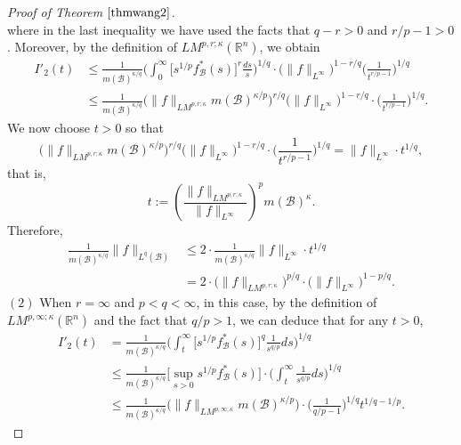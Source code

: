 \documentclass{birkjour}
\theoremstyle{definition}
\theoremstyle{remark}
\numberwithin{equation}{section}
\begin{document}
\begin{proof}[Proof of Theorem $\ref{thmwang2}$]
\begin{equation*}
\end{equation*}
where in the last inequality we have used the facts that $q-r>0$ and $r/p-1>0$. Moreover, by the definition of $LM^{p,r;\kappa}(\mathbb R^n)$, we obtain
\begin{equation*}
\begin{split}
I'_2(t)&\leq\frac{1}{m(\mathcal{B})^{\kappa/q}}
\bigg(\int_0^{\infty}\Big[s^{1/p}f^{*}_{\mathcal{B}}(s)\Big]^r\frac{ds}{s}\bigg)^{1/q}
\cdot\big(\|f\|_{L^\infty}\big)^{1-r/q}\Big(\frac{1}{t^{r/p-1}}\Big)^{1/q}\\
&\leq\frac{1}{m(\mathcal{B})^{\kappa/q}}
\big(\|f\|_{LM^{p,r;\kappa}}m(\mathcal{B})^{\kappa/p}\big)^{r/q}
\big(\|f\|_{L^\infty}\big)^{1-r/q}\cdot\Big(\frac{1}{t^{r/p-1}}\Big)^{1/q}.
\end{split}
\end{equation*}
We now choose $t>0$ so that
\begin{equation*}
\big(\|f\|_{LM^{p,r;\kappa}}m(\mathcal{B})^{\kappa/p}\big)^{r/q}
\big(\|f\|_{L^\infty}\big)^{1-r/q}\cdot\Big(\frac{1}{t^{r/p-1}}\Big)^{1/q}=\|f\|_{L^\infty}\cdot t^{1/q},
\end{equation*}
that is,
\begin{equation*}
t:=\left(\frac{\|f\|_{LM^{p,r;\kappa}}}{\|f\|_{L^\infty}}\right)^pm(\mathcal{B})^{\kappa}.
\end{equation*}
Therefore,
\begin{equation*}
\begin{split}
\frac{1}{m(\mathcal{B})^{\kappa/q}}\|f\|_{L^{q}(\mathcal{B})}
&\leq 2\cdot\frac{1}{m(\mathcal{B})^{\kappa/q}}\|f\|_{L^\infty}\cdot t^{1/q}\\
&=2\cdot\big(\|f\|_{LM^{p,r;\kappa}}\big)^{p/q}\cdot\big(\|f\|_{L^\infty}\big)^{1-p/q}.
\end{split}
\end{equation*}
$(2)$ When $r=\infty$ and $p<q<\infty$, in this case, by the definition of $LM^{p,\infty;\kappa}(\mathbb R^n)$ and the fact that $q/p>1$, we can deduce that for any $t>0$,
\begin{equation*}
\begin{split}
I'_2(t)&=\frac{1}{m(\mathcal{B})^{\kappa/q}}\bigg(\int_{t}^{\infty}\big[s^{1/p}f^{*}_{\mathcal{B}}(s)\big]^{q}\frac{1}{s^{q/p}}ds\bigg)^{1/q}\\
&\leq\frac{1}{m(\mathcal{B})^{\kappa/q}}\Big[\sup_{s>0}s^{1/p}f^{*}_{\mathcal{B}}(s)\Big]
\cdot\bigg(\int_{t}^{\infty}\frac{1}{s^{q/p}}ds\bigg)^{1/q}\\
&\leq \frac{1}{m(\mathcal{B})^{\kappa/q}}
\big(\|f\|_{LM^{p,\infty;\kappa}}m(\mathcal{B})^{\kappa/p}\big)\cdot\Big(\frac{1}{q/p-1}\Big)^{1/q} t^{1/q-1/p}.

\end{split}
\end{equation*}
\end{proof}
\end{document}
